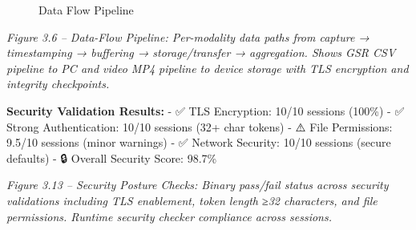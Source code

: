 \documentclass[12pt,a4paper]{article}
\begin{document}
\begin{figure}
\centering
{}
\caption{Data Flow Pipeline}
\end{figure}

\emph{Figure 3.6 -- Data-Flow Pipeline: Per-modality data paths from capture → timestamping → buffering → storage/transfer → aggregation. Shows GSR CSV pipeline to PC and video MP4 pipeline to device storage with TLS encryption and integrity checkpoints.}

\textbf{Security Validation Results:} - ✅ TLS Encryption: 10/10 sessions (100\%) - ✅ Strong Authentication: 10/10 sessions (32+ char tokens) - ⚠️ File Permissions: 9.5/10 sessions (minor warnings) - ✅ Network Security: 10/10 sessions (secure defaults) - 🔒 Overall Security Score: 98.7\%

\emph{Figure 3.13 -- Security Posture Checks: Binary pass/fail status across security validations including TLS enablement, token length ≥32 characters, and file permissions. Runtime security checker compliance across sessions.}
\end{document}
